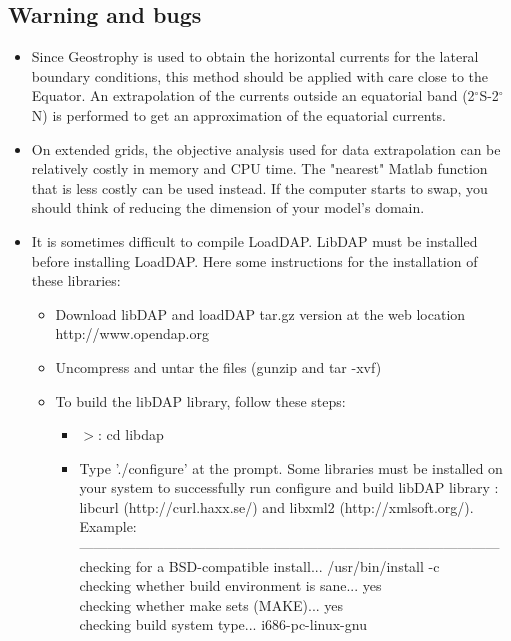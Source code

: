 \subsection{Warning and bugs}
\begin{itemize}
\item Since Geostrophy is used to obtain the horizontal currents for
the lateral boundary conditions, this method should be applied with 
care close to the Equator. An extrapolation of the currents outside 
an equatorial band (2$^\circ$S-2$^\circ$N) is performed to get an 
approximation of the equatorial currents.
\item On extended grids, the objective analysis used for data 
extrapolation can be relatively costly in memory and CPU time. 
The "nearest" Matlab function that is less costly can be used instead.
If the computer starts to swap, you should think of reducing the 
dimension of your model's domain.
\item It is sometimes difficult to compile LoadDAP. 
LibDAP must be installed before installing LoadDAP. Here some instructions 
for the installation of these libraries:\\
\begin{itemize}
\item Download libDAP and loadDAP tar.gz version at the web location
http://www.opendap.org
\item Uncompress and untar the files (gunzip and tar -xvf)
\item To build the libDAP library, follow these steps:\\
\begin{itemize}
\item $>$: cd libdap\\
\item Type './configure' at the prompt. Some libraries must be installed 
on your system to successfully run configure and build libDAP library : libcurl 
(http://curl.haxx.se/) and libxml2 (http://xmlsoft.org/).\\
Example:\\
------------------------------------------------------------------------------------------\\
checking for a BSD-compatible install... /usr/bin/install -c\\
checking whether build environment is sane... yes\\
checking whether make sets (MAKE)... yes\\
checking build system type... i686-pc-linux-gnu\\

\end{itemize}
\end{itemize}
\end{itemize}
